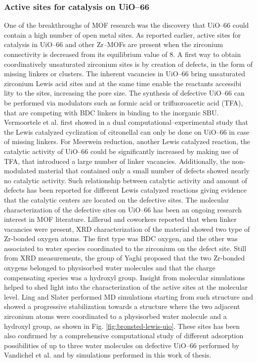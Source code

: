 \subsubsection{Active sites for catalysis on UiO--66}
One of the breakthroughs of MOF research was the discovery that UiO--66 could contain a high number of open metal sites. As reported earlier, active sites for catalysis in UiO--66 and other Zr--MOFs are present when the zirconium connectivity is decreased from its equilibrium value of 8. 
A first way to obtain coordinatively unsaturated zirconium sites is by creation of defects, in the form of missing linkers or clusters. The inherent vacancies in UiO--66 bring unsaturated zirconium Lewis acid sites\cite{wu2013unusual, shearer2014tuned, vermoortele2013synthesis, vandichel2015active, liu2016probing} and at the same time enable the reactants accessibi
lity to the sites, increasing the pore size. The synthesis of defective UiO--66 can be performed via modulators such as formic acid or trifluoroacetic acid (TFA), that are competing with BDC linkers in binding to the inorganic SBU. 
Vermoortele et al. first showed in a dual computational--experimental study that the Lewis catalyzed cyclization of citronellal can only be done on UiO--66 in case of missing linkers\cite{vermoortele2012electronic}. For Meerwein reduction, another Lewis catalyzed reaction, the catalytic activity of UiO--66 could be significantly increased by making use of TFA, that introduced a large number of linker vacancies. Additionally, the non-modulated material that contained only a small number of defects showed nearly no catalytic activity\cite{vermoortele2013synthesis}. Such relationship between catalytic activity and amount of defects has been reported for different Lewis catalyzed reactions giving evidence that the catalytic centers are located on the defective sites. 
The molecular characterization of the defective sites on UiO--66 has been an ongoing research interest in MOF literature. Lillerud and coworkers \cite{oien2014detailed} reported that when linker vacancies were present, XRD characterization of the material showed two type of Zr-bonded oxygen atoms. The first type was BDC oxygen, and the other was associated to water species coordinated to the zirconium on the defect site. Still from XRD measurements, the group of Yaghi \cite{trickett2015definitive} proposed that the two Zr-bonded oxygens belonged to physisorbed water molecules and that the charge compensating species was a hydroxyl group. Insight from molecular simulations helped to shed light into the characterization of the active sites at the molecular level. Ling and Slater \cite{ling2016dynamic} performed MD simulations starting from such structure and showed a progressive stabilization towards a structure where the two adjacent zirconium atoms were coordinated to a physisorbed water molecule and a hydroxyl group, as shown in Fig. \ref{fig:bronsted-lewis-uio}. These sites has been also confirmed by a comprehensive computational study of different adsorption possibilities of up to three water molecules on defective UiO--66 performed by Vandichel et al. \cite{vandichel2016water} and by simulations performed in this work of thesis. 
